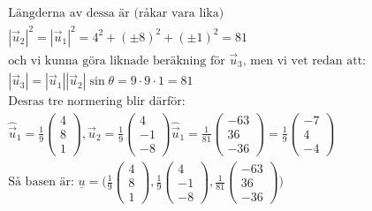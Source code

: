 \begin{align*}
  &\quad  \text{Längderna av dessa är (råkar vara lika)}  \\
  &\quad  |\vec{u}_2|^2 = |\vec{u}_1|^2 = 4^2 + {(\pm{8})}^2 + {(\pm{1})}^2 = 81 \\
  &\quad  \text{och vi kunna göra liknade beräkning för } \vec{u}_3 \text{, men vi vet redan att:} \\
  &\quad  |\vec{u}_3| = |\vec{u}_1||\vec{u}_2|\sin{\theta}=9\cdot{}9\cdot{}1=81 \\
  &\quad  \text{Desras tre normering blir därför:} \\
  &\quad  \hat\vec{u}_1 = \frac{1}{9}\begin{pmatrix} 4 \\ 8 \\ 1 \end{pmatrix},
  \hat\vec{u}_2 = \frac{1}{9}\begin{pmatrix} 4 \\ -1 \\ -8 \end{pmatrix}
  \hat\vec{u}_1 = \frac{1}{81}\begin{pmatrix} -63 \\ 36 \\ -36 \end{pmatrix}=
  \frac{1}{9}\begin{pmatrix} -7 \\ 4 \\ -4 \end{pmatrix} \\
  &\quad  \text{Så basen är: }
  \underline{u} = \Bigg(
  \frac{1}{9}\begin{pmatrix} 4 \\ 8 \\ 1 \end{pmatrix},
  \frac{1}{9}\begin{pmatrix} 4 \\ -1 \\ -8 \end{pmatrix},
  \frac{1}{81}\begin{pmatrix} -63 \\ 36 \\ -36 \end{pmatrix}
  \Bigg) \\
\end{align*}

